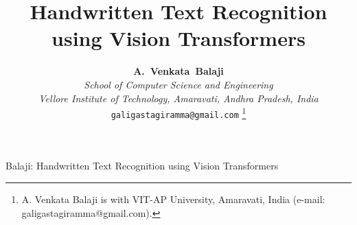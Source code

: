 \documentclass{IEEEtran}
\begin{document}
\title{Handwritten Text Recognition using Vision Transformers}

\author{\textbf{\Large A.~Venkata~Balaji}\\[0.3em]
\normalsize\textit{School of Computer Science and Engineering}\\[0.15em]
\normalsize\textit{Vellore Institute of Technology, Amaravati, Andhra Pradesh, India}\\[0.15em]
\normalsize\texttt{galigastagiramma@gmail.com}%
\thanks{A. Venkata Balaji is with VIT-AP University, Amaravati, India (e-mail: galigastagiramma@gmail.com).}%
}

%
{Balaji: Handwritten Text Recognition using Vision Transformers}

\maketitle
\end{document}

